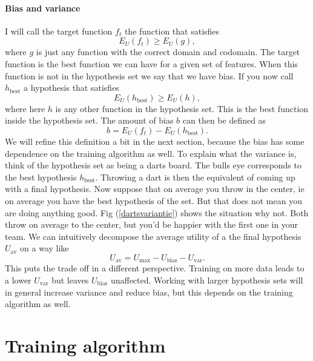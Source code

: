 \documentclass{report}
\theoremstyle{definition}
\begin{document}
\paragraph{Bias and variance}
I will call the target function $f_t$ the function that satisfies
\begin{equation}
E_{U}(f_t) \geq E_{U}(g),
\end{equation}
where $g$ is just any function with the correct domain and codomain. The target function is the best function we can have for a given set of features. When this function is not in the hypothesis set we say that we have bias. If you now call $h_{\text{best}}$ a hypothesis that satisfies
\begin{equation}
E_{U}(h_{\text{best}}) \geq E_{U}(h),
\end{equation}
where here $h$ is any other function in the hypothesis set. This is the best function inside the hypothesis set. The amount of bias $b$ can then be defined as
\begin{equation}
b = E_{U}(f_t) - E_{U}(h_{\text{best}}).
\end{equation}
We will refine this definition a bit in the next section, because the bias has some dependence on the training algorithm as well. To explain what the variance is, think of the hypothesis set as being a darts board. The bulls eye corresponds to the best hypothesis $h_{\text{best}}$. Throwing a dart is then the equivalent of coming up with a final hypothesis. Now suppose that on average you throw in the center, ie on average you have the best hypothesis of the set. But that does not mean you are doing anything good. Fig (\ref{dartsvariantie}) shows the situation why not. Both throw on average to the center, but you'd be happier with the first one in your team.
We can intuitively decompose the average utility of a the final hypothesis $U_{\text{av}}$ on a way like
\begin{equation}
U_{\text{av}} = U_{\text{max}} - U_{\text{bias}} - U_{\text{var}}.
\end{equation}
This puts the trade off in a different perspective. Training on more data leads to a lower $U_{\text{var}}$ but leaves $U_{\text{bias}}$ unaffected. Working with larger hypothesis sets will in general increase variance and reduce bias, but this depends on the training algorithm as well.  
	\section{Training algorithm}
\end{document}
